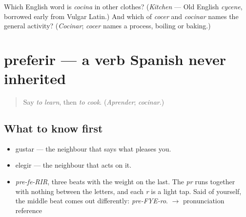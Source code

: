\begin{tcolorbox}[breakable,colback=teal!4,colframe=teal!35!black,title={Before you move on}]
Which English word is \emph{cocina} in other clothes? (\emph{Kitchen} — Old English \emph{cycene}, borrowed early from Vulgar Latin.) And which of \emph{cocer} and \emph{cocinar} names the general activity? (\emph{Cocinar}; \emph{cocer} names a process, boiling or baking.)
\end{tcolorbox}
\section[preferir]{preferir — a verb Spanish never inherited}

\label{lesson:ES-C396-preferir}



\begin{quote}
Say \emph{to learn}, then \emph{to cook}. (\emph{Aprender}; \emph{cocinar}.)
\end{quote}

\subsection*{What to know first}
\begin{itemize}
\raggedright
  \item gustar — the neighbour that says what pleases you.
  \item elegir — the neighbour that acts on it.
\end{itemize}

\begin{sounds}
\begin{itemize}
\raggedright
  \item \emph{pre-fe-RIR}, three beats with the weight on the last. The \emph{pr} runs together with nothing between the letters, and each \emph{r} is a light tap. Said of yourself, the middle beat comes out differently: \emph{pre-FYE-ro}. $\to$ pronunciation reference
\end{itemize}
\end{sounds}

